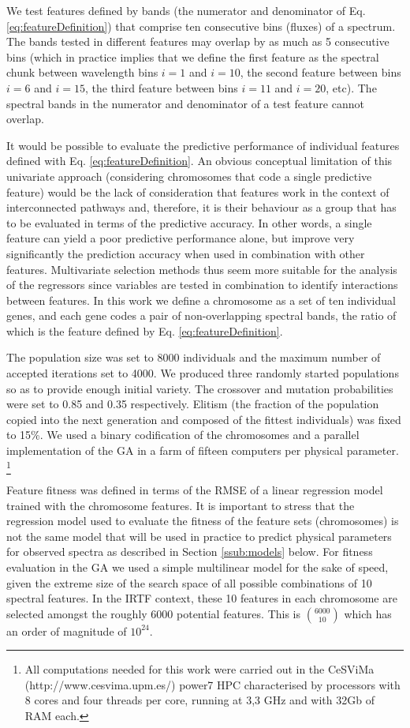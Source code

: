 We test features defined by bands (the numerator and denominator of
Eq. \ref{eq:featureDefinition}) that comprise ten consecutive bins
(fluxes) of a spectrum. The bands tested in different features may
overlap by as much as 5 consecutive bins (which in practice implies
that we define the first feature as the spectral chunk between
wavelength bins $i=1$ and $i=10$, the second feature between bins
$i=6$ and $i=15$, the third feature between bins $i=11$ and $i=20$,
etc). The spectral bands in the numerator and denominator of a test
feature cannot overlap.

It would be possible to evaluate the predictive performance of
individual features defined with Eq. \ref{eq:featureDefinition}. An
obvious conceptual limitation of this univariate approach (considering
chromosomes that code a single predictive feature) would be the lack
of consideration that features work in the context of interconnected
pathways and, therefore, it is their behaviour as a group that has to
be evaluated in terms of the predictive accuracy. In other words, a
single feature can yield a poor predictive performance alone, but
improve very significantly the prediction accuracy when used in
combination with other features. Multivariate selection methods thus
seem more suitable for the analysis of the regressors since variables
are tested in combination to identify interactions between
features. In this work we define a chromosome as a set of ten
individual genes, and each gene codes a pair of non-overlapping
spectral bands, the ratio of which is the feature defined by
Eq. \ref{eq:featureDefinition}.

The population size was set to 8000 individuals and the maximum number
of accepted iterations set to 4000. We produced three randomly started
populations so as to provide enough initial variety. The crossover and
mutation probabilities were set to 0.85 and 0.35 respectively. Elitism
(the fraction of the population copied into the next generation and
composed of the fittest individuals) was fixed to 15\%. We used a
binary codification of the chromosomes and a parallel implementation
of the GA in a farm of fifteen computers per physical
parameter. \footnote{All computations needed for this work were
carried out in the CeSViMa (http://www.cesvima.upm.es/) power7 HPC
characterised by processors with 8 cores and four threads per
core, running at 3,3 GHz and with 32Gb of RAM each.}

Feature fitness was defined in terms of the RMSE of a linear
regression model trained with the chromosome features. It is important
to stress that the regression model used to evaluate the fitness of
the feature sets (chromosomes) is not the same model that will be used
in practice to predict physical parameters for observed spectra as
described in Section \ref{ssub:models} below. For fitness
evaluation in the GA we used a simple multilinear model for the sake
of speed, given the extreme size of the search space of all possible
combinations of 10 spectral features. In the IRTF context, these 10
features in each chromosome are selected amongst the roughly 6000
potential features. This is $\binom{6000}{10}$ which has an order of
magnitude of $10^{24}$.

